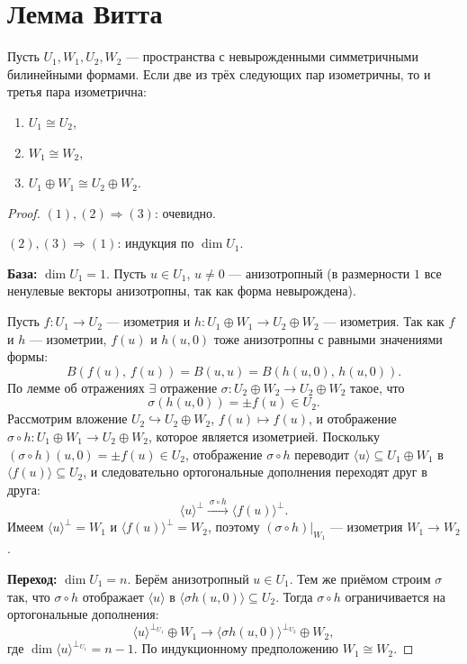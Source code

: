 \section{Лемма Витта}

\begin{theorem}[Витта]
    Пусть $U_1, W_1, U_2, W_2$ --- пространства с невырожденными симметричными билинейными формами.
    Если две из трёх следующих пар изометричны, то и третья пара изометрична:
    \begin{enumerate}
        \item $U_1 \cong U_2$,
        \item $W_1 \cong W_2$,
        \item $U_1 \oplus W_1 \cong U_2 \oplus W_2$.
    \end{enumerate}
    \begin{proof}
        $(1), (2) \Rightarrow (3)$: очевидно.

        $(2), (3) \Rightarrow (1)$: индукция по $\dim U_1$.

        \textbf{База:} $\dim U_1 = 1$. Пусть $u \in U_1$, $u \neq 0$ --- анизотропный
        (в размерности $1$ все ненулевые векторы анизотропны, так как форма невырождена).

        Пусть $f\colon U_1 \to U_2$ --- изометрия и $h\colon U_1 \oplus W_1 \to U_2 \oplus W_2$ --- изометрия.
        Так как $f$ и $h$ --- изометрии, $f(u)$ и $h(u, 0)$ тоже анизотропны с равными значениями формы:
        \[
            B(f(u),\, f(u)) = B(u, u) = B(h(u,0),\, h(u,0)).
        \]
        По лемме об отражениях $\exists$ отражение $\sigma\colon U_2 \oplus W_2 \to U_2 \oplus W_2$ такое, что
        \[
            \sigma(h(u, 0)) = \pm f(u) \in U_2.
        \]
        Рассмотрим вложение $U_2 \hookrightarrow U_2 \oplus W_2$, $f(u) \mapsto f(u)$,
        и отображение $\sigma \circ h\colon U_1 \oplus W_1 \to U_2 \oplus W_2$, которое является изометрией.
        Поскольку $(\sigma \circ h)(u, 0) = \pm f(u) \in U_2$, отображение $\sigma \circ h$ переводит
        $\langle u \rangle \subseteq U_1 \oplus W_1$ в $\langle f(u) \rangle \subseteq U_2$,
        и следовательно ортогональные дополнения переходят друг в друга:
        \[
            \langle u \rangle^\perp \xrightarrow{\ \sigma \circ h\ } \langle f(u) \rangle^\perp.
        \]
        Имеем $\langle u \rangle^\perp = W_1$ и $\langle f(u) \rangle^\perp = W_2$,
        поэтому $(\sigma \circ h)\big|_{W_1}$ --- изометрия $W_1 \to W_2$.

        \textbf{Переход:} $\dim U_1 = n$. Берём анизотропный $u \in U_1$.
        Тем же приёмом строим $\sigma$ так, что $\sigma \circ h$ отображает $\langle u \rangle$ в $\langle \sigma h(u,0) \rangle \subseteq U_2$.
        Тогда $\sigma \circ h$ ограничивается на ортогональные дополнения:
        \[
            \langle u \rangle^{\perp_{U_1}} \oplus W_1 \longrightarrow
            \langle \sigma h(u,0) \rangle^{\perp_{U_2}} \oplus W_2,
        \]
        где $\dim \langle u \rangle^{\perp_{U_1}} = n - 1$.
        По индукционному предположению $W_1 \cong W_2$.
    \end{proof}
\end{theorem}
